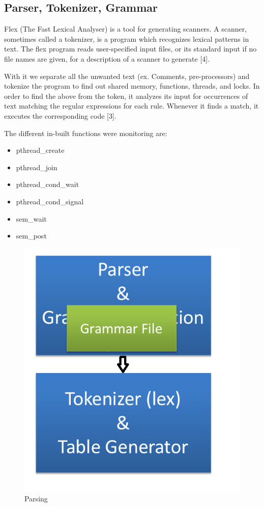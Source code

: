 \subsection{Parser, Tokenizer, Grammar}
Flex (The Fast Lexical Analyser) is a tool for generating scanners. A scanner, sometimes called a tokenizer, is a program which recognizes lexical patterns in text. The flex program reads user-specified input files, or its standard input if no file names are given, for a description of a scanner to generate [4].

With it we separate all the unwanted text (ex. Comments, pre-processors) and tokenize the program to find out shared memory, functions, threads, and locks. In order to find the above from the token, it analyzes its input for occurrences of text matching the regular expressions for each rule. Whenever it finds a match, it executes the corresponding code [3].

The different in-built functions were monitoring are:\\
\begin{itemize}
\item pthread\_create
\item pthread\_join
\item pthread\_cond\_wait
\item pthread\_cond\_signal
\item sem\_wait
\item sem\_post
\end{itemize}
\begin{figure}[H]
\centering
\includegraphics[scale=0.4]{grammar.png}
\caption{Parsing}
\label{<<Label>>}
\end{figure}


